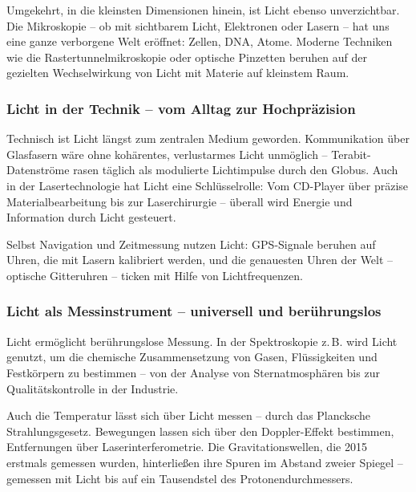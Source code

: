 Umgekehrt, in die kleinsten Dimensionen hinein, ist Licht ebenso unverzichtbar. Die Mikroskopie – ob mit sichtbarem Licht, Elektronen oder Lasern – hat uns eine ganze verborgene Welt eröffnet: Zellen, DNA, Atome. Moderne Techniken wie die Rastertunnelmikroskopie oder optische Pinzetten beruhen auf der gezielten Wechselwirkung von Licht mit Materie auf kleinstem Raum.

\subsubsection*{Licht in der Technik – vom Alltag zur Hochpräzision}
Technisch ist Licht längst zum zentralen Medium geworden. Kommunikation über Glasfasern wäre ohne kohärentes, verlustarmes Licht unmöglich – Terabit-Datenströme rasen täglich als modulierte Lichtimpulse durch den Globus. Auch in der Lasertechnologie hat Licht eine Schlüsselrolle: Vom CD-Player über präzise Materialbearbeitung bis zur Laserchirurgie – überall wird Energie und Information durch Licht gesteuert.

Selbst Navigation und Zeitmessung nutzen Licht: GPS-Signale beruhen auf Uhren, die mit Lasern kalibriert werden, und die genauesten Uhren der Welt – optische Gitteruhren – ticken mit Hilfe von Lichtfrequenzen.

\subsubsection*{Licht als Messinstrument – universell und berührungslos}
Licht ermöglicht berührungslose Messung. In der Spektroskopie z.\,B. wird Licht genutzt, um die chemische Zusammensetzung von Gasen, Flüssigkeiten und Festkörpern zu bestimmen – von der Analyse von Sternatmosphären bis zur Qualitätskontrolle in der Industrie.

Auch die Temperatur lässt sich über Licht messen – durch das Plancksche Strahlungsgesetz. Bewegungen lassen sich über den Doppler-Effekt bestimmen, Entfernungen über Laserinterferometrie. Die Gravitationswellen, die 2015 erstmals gemessen wurden, hinterließen ihre Spuren im Abstand zweier Spiegel – gemessen mit Licht bis auf ein Tausendstel des Protonendurchmessers.

